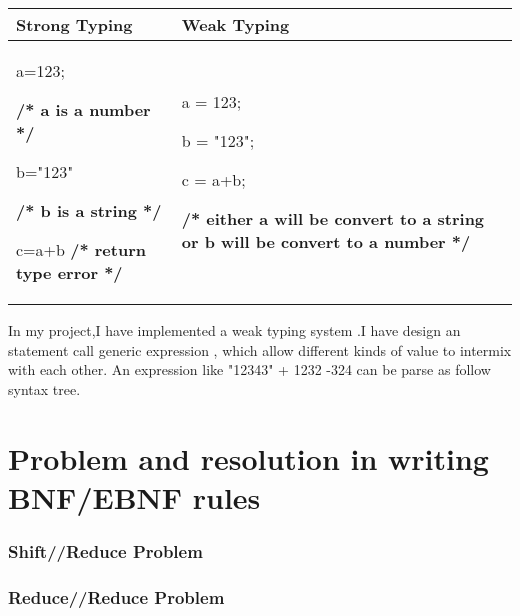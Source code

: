 \begin{tabular}{p{6cm}|p{6cm}}
\hline Strong Typing & Weak Typing  \\ 
\hline a=123; \par 
\textbf{/* a is a number */} \par 
b="123" \par  
\textbf{/* b is a string */} \par 
c=a+b \textbf{/* return type error */}  &  
a = 123; \par 
b = "123"; \par
c = a+b; \par 
\textbf{/* either a will be convert to a string or b will be convert to a number */}

\\ 
\hline 
\end{tabular} 

In my project,I have implemented a weak typing system .I have design an statement call generic expression , which allow different kinds of value to intermix with each other. An expression like "12343" + 1232 -324 can be parse as follow syntax tree.





\section{Problem and resolution in writing BNF/EBNF rules}
\subsubsection{Shift//Reduce Problem}

\subsubsection{Reduce//Reduce Problem}


